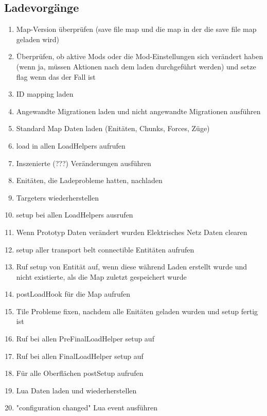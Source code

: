 \subsection{Ladevorgänge}
\begin{enumerate}
    \item Map-Version überprüfen (save file map und die map in der die save file map geladen wird)
    \item Überprüfen, ob aktive Mods oder die Mod-Einstellungen sich verändert haben (wenn ja, müssen Aktionen nach dem laden durchgeführt werden) und setze flag wenn das der Fall ist
    \item ID mapping laden
    \item Angewandte Migrationen laden und nicht angewandte Migrationen ausführen
    \item Standard Map Daten laden (Enitäten, Chunks, Forces, Züge)
    \item load in allen LoadHelpers aufrufen
    \item Inszenierte (???) Veränderungen ausführen
    \item Enitäten, die Ladeprobleme hatten, nachladen
    \item Targeters wiederherstellen
    \item setup bei allen LoadHelpers ausrufen
    \item Wenn Prototyp Daten verändert wurden Elektrisches Netz Daten clearen
    \item setup aller transport belt connectible Entitäten aufrufen
    \item Ruf setup von Entität auf, wenn diese während Laden erstellt wurde und nicht existierte, als die Map zuletzt gespeichert wurde
    \item postLoadHook für die Map aufrufen
    \item Tile Probleme fixen, nachdem alle Enitäten geladen wurden und setup fertig ist
    \item Ruf bei allen PreFinalLoadHelper setup auf
    \item Ruf bei allen FinalLoadHelper setup auf
    \item Für alle Oberflächen postSetup aufrufen
    \item Lua Daten laden und wiederherstellen
    \item "configuration changed" Lua event ausführen
\end{enumerate}




